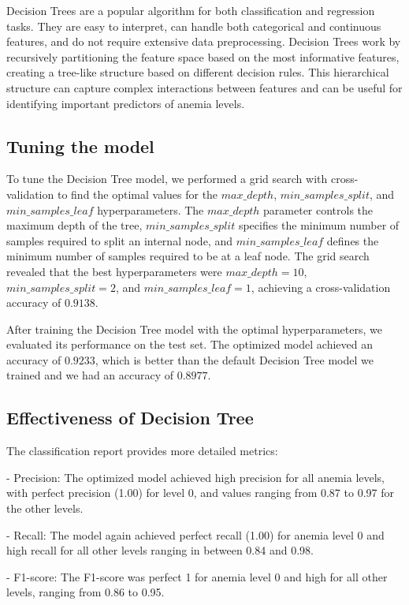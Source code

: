 Decision Trees are a popular algorithm for both classification and regression tasks. They are easy to interpret, can handle both categorical and continuous features, and do not require extensive data preprocessing. Decision Trees work by recursively partitioning the feature space based on the most informative features, creating a tree-like structure based on different decision rules. This hierarchical structure can capture complex interactions between features and can be useful for identifying important predictors of anemia levels.

\subsection{Tuning the model}

To tune the Decision Tree model, we performed a grid search with cross-validation to find the optimal values for the $max\_depth$, $min\_samples\_split$, and $min\_samples\_leaf$ hyperparameters. The $max\_depth$ parameter controls the maximum depth of the tree, $min\_samples\_split$ specifies the minimum number of samples required to split an internal node, and $min\_samples\_leaf$ defines the minimum number of samples required to be at a leaf node. The grid search revealed that the best hyperparameters were $max\_depth=10$, $min\_samples\_split=2$, and $min\_samples\_leaf=1$, achieving a cross-validation accuracy of $0.9138$.


After training the Decision Tree model with the optimal hyperparameters, we evaluated its performance on the test set. The optimized model achieved an accuracy of $0.9233$, which is better than the default Decision Tree model we trained and we had an accuracy of $0.8977$.

\subsection{Effectiveness of Decision Tree}


The classification report provides more detailed metrics:


- Precision: The optimized model achieved high precision for all anemia levels, with perfect precision (1.00) for level 0, and values ranging from 0.87 to 0.97 for the other levels.


- Recall: The model again achieved perfect recall (1.00) for anemia level 0 and high recall for all other levels ranging in between 0.84 and 0.98.


- F1-score: The F1-score was perfect 1 for anemia level 0 and high for all other levels, ranging from 0.86 to 0.95.

